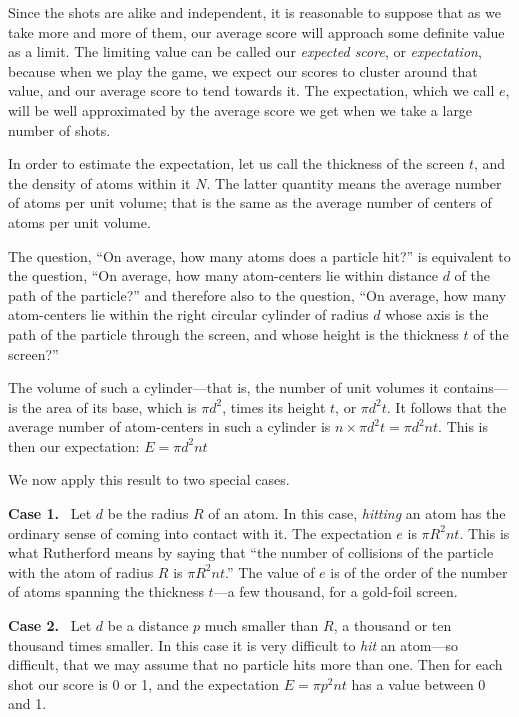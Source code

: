 Since the shots are alike and independent, it is reasonable to suppose
that as we take more and more of them, our average score will approach
some definite value as a limit. The limiting value can be called our
\emph{expected score}, or \emph{expectation}, because when we play the
game, we expect our scores to cluster around that value, and our average
score to tend towards it. The expectation, which we call $e$, will
be well approximated by the average score we get when we take a large
number of shots.

In order to estimate the expectation, let us call the thickness of the
screen $t$, and the density of atoms within it $N$. The latter
quantity means the average number of atoms per unit volume; that is the
same as the average number of centers of atoms per unit volume.

The question, ``On average, how many atoms does a particle hit?'' is
equivalent to the question, ``On average, how many atom-centers lie
within distance $d$ of the path of the particle?'' and therefore
also to the question, ``On average, how many atom-centers lie within the
right circular cylinder of radius $d$ whose axis is the path of the
particle through the screen, and whose height is the thickness $t$
of the screen?''

The volume of such a cylinder---that is, the number of unit volumes it
contains---is the area of its base, which is
$\pi d^2$, times its height $t$, or
$\pi d^{2}t$. It follows that the average
number of atom-centers in such a cylinder is
$n \times \pi d^{2}t = \pi d^{2}nt$. This is then our
expectation: $E = \pi d^{2}nt$

We now apply this result to two special cases.

\textbf{Case 1.}~ Let $d$ be the radius $R$ of an atom. In
this case, \emph{hitting} an atom has the ordinary sense of coming into
contact with it. The expectation $e$ is
$\pi R^{2}nt$. This is what
Rutherford means by saying that ``the number of collisions of the
particle with the atom of radius $R$ is
$\pi R^{2}nt$.'' The value of
$e$ is of the order of the number of atoms spanning the thickness
$t$---a few thousand, for a gold-foil screen.

\textbf{Case 2.}~ Let $d$ be a distance $p$ much smaller than
$R$, a thousand or ten thousand times smaller. In this case it is
very difficult to \emph{hit} an atom---so difficult, that we may assume
that no particle hits more than one. Then for each shot our score is 0
or 1, and the expectation $E = \pi p^{2}nt$ has a value between 0
and 1.


